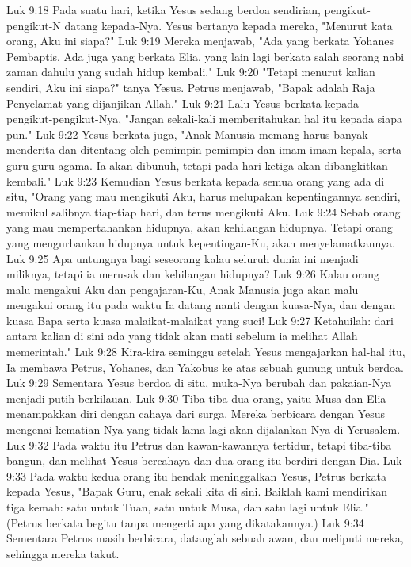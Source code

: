 Luk 9:18  Pada suatu hari, ketika Yesus sedang berdoa sendirian, pengikut-pengikut-N datang kepada-Nya. Yesus bertanya kepada mereka, "Menurut kata orang, Aku ini siapa?"
Luk 9:19  Mereka menjawab, "Ada yang berkata Yohanes Pembaptis. Ada juga yang berkata Elia, yang lain lagi berkata salah seorang nabi zaman dahulu yang sudah hidup kembali."
Luk 9:20  "Tetapi menurut kalian sendiri, Aku ini siapa?" tanya Yesus. Petrus menjawab, "Bapak adalah Raja Penyelamat yang dijanjikan Allah."
Luk 9:21  Lalu Yesus berkata kepada pengikut-pengikut-Nya, "Jangan sekali-kali memberitahukan hal itu kepada siapa pun."
Luk 9:22  Yesus berkata juga, "Anak Manusia memang harus banyak menderita dan ditentang oleh pemimpin-pemimpin dan imam-imam kepala, serta guru-guru agama. Ia akan dibunuh, tetapi pada hari ketiga akan dibangkitkan kembali."
Luk 9:23  Kemudian Yesus berkata kepada semua orang yang ada di situ, "Orang yang mau mengikuti Aku, harus melupakan kepentingannya sendiri, memikul salibnya tiap-tiap hari, dan terus mengikuti Aku.
Luk 9:24  Sebab orang yang mau mempertahankan hidupnya, akan kehilangan hidupnya. Tetapi orang yang mengurbankan hidupnya untuk kepentingan-Ku, akan menyelamatkannya.
Luk 9:25  Apa untungnya bagi seseorang kalau seluruh dunia ini menjadi miliknya, tetapi ia merusak dan kehilangan hidupnya?
Luk 9:26  Kalau orang malu mengakui Aku dan pengajaran-Ku, Anak Manusia juga akan malu mengakui orang itu pada waktu Ia datang nanti dengan kuasa-Nya, dan dengan kuasa Bapa serta kuasa malaikat-malaikat yang suci!
Luk 9:27  Ketahuilah: dari antara kalian di sini ada yang tidak akan mati sebelum ia melihat Allah memerintah."
Luk 9:28  Kira-kira seminggu setelah Yesus mengajarkan hal-hal itu, Ia membawa Petrus, Yohanes, dan Yakobus ke atas sebuah gunung untuk berdoa.
Luk 9:29  Sementara Yesus berdoa di situ, muka-Nya berubah dan pakaian-Nya menjadi putih berkilauan.
Luk 9:30  Tiba-tiba dua orang, yaitu Musa dan Elia menampakkan diri dengan cahaya dari surga. Mereka berbicara dengan Yesus mengenai kematian-Nya yang tidak lama lagi akan dijalankan-Nya di Yerusalem.
Luk 9:32  Pada waktu itu Petrus dan kawan-kawannya tertidur, tetapi tiba-tiba bangun, dan melihat Yesus bercahaya dan dua orang itu berdiri dengan Dia.
Luk 9:33  Pada waktu kedua orang itu hendak meninggalkan Yesus, Petrus berkata kepada Yesus, "Bapak Guru, enak sekali kita di sini. Baiklah kami mendirikan tiga kemah: satu untuk Tuan, satu untuk Musa, dan satu lagi untuk Elia." (Petrus berkata begitu tanpa mengerti apa yang dikatakannya.)
Luk 9:34  Sementara Petrus masih berbicara, datanglah sebuah awan, dan meliputi mereka, sehingga mereka takut.

